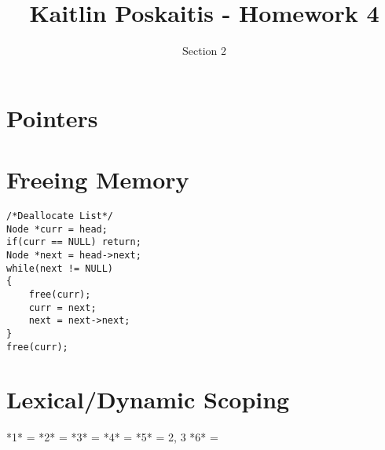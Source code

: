 \documentclass[11pt]{article}
\title{\bf Kaitlin Poskaitis - Homework 4}
\author{Section 2}
\date{}
\begin{document}
\maketitle

\section{Pointers}

\section{Freeing Memory}

\begin{lstlisting}
/*Deallocate List*/
Node *curr = head;
if(curr == NULL) return;
Node *next = head->next;
while(next != NULL)
{
	free(curr);
	curr = next;
	next = next->next;
}
free(curr);

\end{lstlisting}

\section{Lexical/Dynamic Scoping}

*1* = 
*2* = 
*3* =
*4* =
*5* = 2, 3
*6* =
\end{document}
